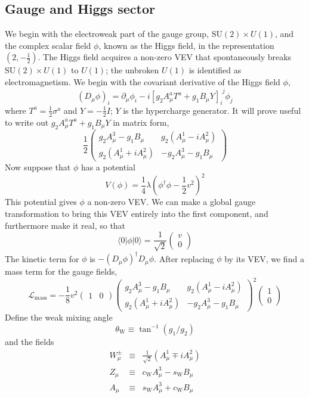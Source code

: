\subsection{Gauge and Higgs sector}
We begin with the electroweak part of the gauge group, $\mathrm{SU}(2)\times U(1)$, and the complex scalar field $\phi$, known as the Higgs field, in the representation $(2,-\frac{1}{2})$. The Higgs field acquires a non-zero VEV that spontaneously breaks $\mathrm{SU}(2)\times U(1)$ to $U(1)$; the unbroken $U(1)$ is identified as electromagnetism.
We begin with the covariant derivative of the Higgs field $\phi$,
\[(D_{\mu}\phi)_i = \partial_{\mu}\phi_i - i[g_2 A^a_{\mu}T^a + g_1B_{\mu}Y]_{i}^{\phantom{i}j} \phi_j\] where $T^a = \frac{1}{2}\sigma^a$ and $Y = -\frac{1}{2}I$; $Y$ is the hypercharge generator. It will prove
useful to write out $g_2 A^a_{\mu}T^a + g_1B_{\mu}Y$ in matrix form,
\[ \frac{1}{2} \begin{pmatrix}
g_2A^3_{\mu}-g_1B_{\mu} & g_2(A^1_{\mu} - iA^2_{\mu}) \\
g_2(A^1_{\mu} + iA^2_{\mu}) & -g_2A^3_{\mu}-g_1B_{\mu}
\end{pmatrix}\]
Now suppose that $\phi$ has a potential
\[V(\phi) = \frac{1}{4}\lambda (\phi^{\dagger}\phi - \frac{1}{2}v^2)^2\]
This potential gives $\phi$ a non-zero VEV. We can make a global gauge transformation to bring this VEV entirely into the first component, and furthermore make it real, so that
\[\langle 0 | \phi | 0 \rangle =  \frac{1}{\sqrt{2}}\begin{pmatrix}
v \\ 0
\end{pmatrix} \]
The kinetic term for $\phi$ is $-(D_{\mu}\phi)^{\dagger}D_{\mu}\phi$. After replacing $\phi$ by its VEV, we find a mass term for the gauge fields,
\[\mathcal{L}_{\mathrm{mass}}  = - \frac{1}{8}v^2 \begin{pmatrix}
1 & 0 \end{pmatrix} \begin{pmatrix}
g_2A^3_{\mu}-g_1B_{\mu} & g_2(A^1_{\mu} - iA^2_{\mu}) \\
g_2(A^1_{\mu} + iA^2_{\mu}) & -g_2A^3_{\mu}-g_1B_{\mu}
\end{pmatrix}^2 \begin{pmatrix} 1 \\ 0 \end{pmatrix} \]
Define the weak mixing angle
\[\theta_{\mathrm{W}} \equiv \tan^{-1}(g_1/g_2)\]
and the fields
\begin{eqnarray}
W^{\pm}_{\mu} &\equiv & \frac{1}{\sqrt{2}} (A^1_{\mu} \mp iA^2_{\mu}) \nonumber \\
Z_{\mu}  &\equiv & c_{\mathrm{W}} A^3_{\mu} - s_{\mathrm{W}} B_{\mu} \nonumber \\
A_{\mu}  &\equiv & s_{\mathrm{W}} A^3_{\mu} + c_{\mathrm{W}} B_{\mu} \nonumber
\end{eqnarray}

